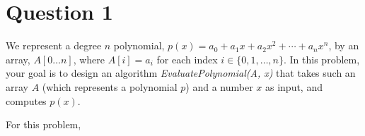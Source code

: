 \section*{Question 1}
We represent a degree \(n\) polynomial, \(p(x) = a_0 + a_1x + a_2x^2 + \cdots + a_nx^n\), by an array, \(A[0 \dots n]\),
where \(A[i] = a_i\) for each index \(i \in \{0, 1, \dots, n\}\). In this problem, your goal is to design an algorithm
\textit{EvaluatePolynomial(A, x)} that takes such an array \(A\) (which represents a polynomial \(p\)) and a number
\(x\) as input, and computes \(p(x)\).

For this problem,
